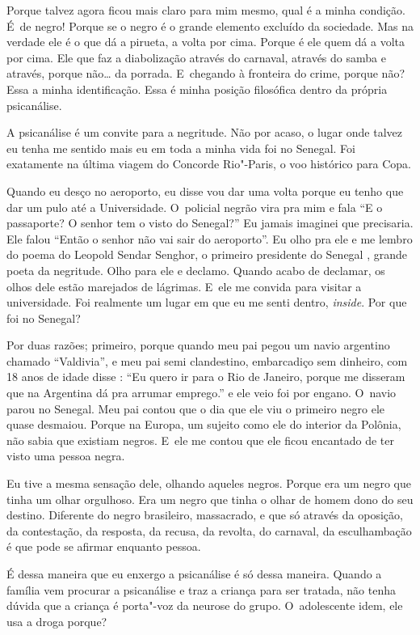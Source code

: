 Porque talvez agora ficou mais claro para mim mesmo, qual é a minha
condição. É~de negro! Porque se o negro é o grande elemento excluído da
sociedade. Mas na verdade ele é o que dá a pirueta, a volta por cima.
Porque é ele quem dá a volta por cima. Ele que faz a diabolização
através do carnaval, através do samba e através, porque não… da
porrada. E~chegando à fronteira do crime, porque não? Essa a minha
identificação. Essa é minha posição filosófica dentro da própria
psicanálise.

A psicanálise é um convite para a negritude. Não por acaso, o lugar onde
talvez eu tenha me sentido mais eu em toda a minha vida foi no Senegal.
Foi exatamente na última viagem do Concorde Rio"-Paris, o voo histórico
para Copa.

Quando eu desço no aeroporto, eu disse vou dar uma volta porque eu tenho
que dar um pulo até a Universidade. O~policial negrão vira pra mim e
fala ``E o passaporte? O senhor tem o visto do Senegal?'' Eu jamais
imaginei que precisaria. Ele falou ``Então o senhor não vai sair do
aeroporto''. Eu olho pra ele e me lembro do poema do Leopold Sendar
Senghor, o primeiro presidente do Senegal , grande poeta da negritude.
Olho para ele e declamo. Quando acabo de declamar, os olhos dele estão
marejados de lágrimas. E~ele me convida para visitar a universidade. Foi
realmente um lugar em que eu me senti dentro, \emph{inside}. Por que foi
no Senegal?

Por duas razões; primeiro, porque quando meu pai pegou um navio
argentino chamado ``Valdivia'', e meu pai semi clandestino, embarcadiço
sem dinheiro, com 18 anos de idade disse : ``Eu quero ir para o Rio de
Janeiro, porque me disseram que na Argentina dá pra arrumar emprego.'' e
ele veio foi por engano. O~navio parou no Senegal. Meu pai contou que o
dia que ele viu o primeiro negro ele quase desmaiou. Porque na Europa,
um sujeito como ele do interior da Polônia, não sabia que existiam
negros. E~ele me contou que ele ficou encantado de ter visto uma pessoa
negra.

Eu tive a mesma sensação dele, olhando aqueles negros. Porque era um
negro que tinha um olhar orgulhoso. Era um negro que tinha o olhar de
homem dono do seu destino. Diferente do negro brasileiro, massacrado, e
que só através da oposição, da contestação, da resposta, da recusa, da
revolta, do carnaval, da esculhambação é que pode se afirmar enquanto
pessoa.

É dessa maneira que eu enxergo a psicanálise é só dessa maneira. Quando
a família vem procurar a psicanálise e traz a criança para ser tratada,
não tenha dúvida que a criança é porta"-voz da neurose do grupo. O~adolescente idem, ele usa a droga porque?

